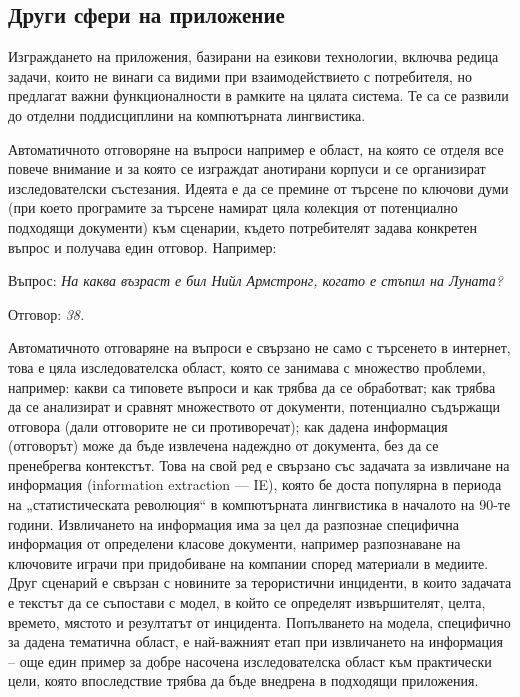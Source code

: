 \begin{multicols}{2}
\subsection{Други сфери на приложение}

Изграждането на приложения, базирани на езикови технологии, включва редица задачи, които не винаги са видими при взаимодействието с потребителя,
 но предлагат важни функционалности в рамките на цялата система. Те са се развили до отделни поддисциплини на компютърната лингвистика.

Автоматичното отговоряне на въпроси например е област, на която се отделя все повече внимание и за която се изграждат анотирани корпуси и се организират изследователски състезания. Идеята е да се премине от търсене по ключови думи (при което програмите за търсене намират цяла колекция от потенциално
 подходящи документи) към сценарии, където потребителят задава конкретен въпрос и получава един отговор. Например: 

{
\hspace{0.5cm}Въпрос: {\it На каква възраст е бил Нийл Армстронг, когато е стъпил на Луната?}

\hspace{0.5cm}Отговор: {\it 38.}
}
 
Автоматичното отговаряне на въпроси е свързано не само с търсенето в интернет, това е цяла изследователска област, която се занимава с множество проблеми, например: какви са типовете въпроси и как трябва да се обработват; как трябва да се анализират и сравнят множеството от документи, потенциално
 съдържащи отговора (дали отговорите не си противоречат); как
дадена информация (отговорът) може да бъде извлечена  надеждно от документа, без да се пренебрегва контекстът.
Това на свой ред е свързано със задачата за извличане на информация (information extraction — IE), която бе доста популярна в периода на „статистическата революция“ в компютърната лингвистика в началото на 90-те години. Извличането на информация има за цел да разпознае специфична информация от определени класове документи, например разпознаване на ключовите играчи при
 придобиване на компании според материали в медиите. Друг сценарий е свързан с новините за терористични инциденти, в които задачата е текстът да се съпостави  с модел, в който се определят извършителят, целта, времето, мястото и резултатът от инцидента. Попълването на модела, специфично за дадена тематична област, е най-важният етап при извличането на информация – още
 един пример за добре насочена изследователска област към практически цели, която впоследствие трябва да бъде внедрена в подходящи приложения.


\end{multicols}

